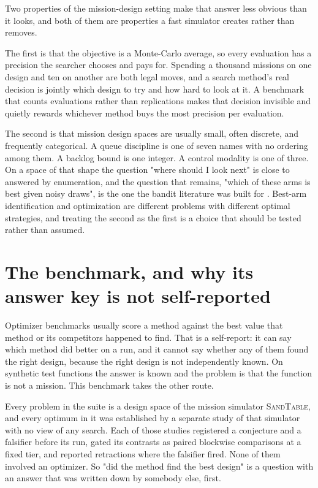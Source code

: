 \documentclass[11pt]{article}
\newcommand{\sandtable}{\textsc{SandTable}}
\begin{document}
Two properties of the mission-design setting make that answer less obvious than it looks, and both
of them are properties a fast simulator creates rather than removes.

The first is that the objective is a Monte-Carlo average, so every evaluation has a precision the
searcher chooses and pays for. Spending a thousand missions on one design and ten on another are
both legal moves, and a search method's real decision is jointly which design to try and how hard
to look at it. A benchmark that counts evaluations rather than replications makes that decision
invisible and quietly rewards whichever method buys the most precision per evaluation.

The second is that mission design spaces are usually small, often discrete, and frequently
categorical. A queue discipline is one of seven names with no ordering among them. A backlog bound
is one integer. A control modality is one of three. On a space of that shape the question "where
should I look next" is close to answered by enumeration, and the question that remains, "which of
these arms is best given noisy draws", is the one the bandit literature was built for
\citep{bubeck2011pure,karnin2013almost}. Best-arm identification and optimization are different
problems with different optimal strategies, and treating the second as the first is a choice that
should be tested rather than assumed.

\section{The benchmark, and why its answer key is not self-reported}
\label{sec:bench}

Optimizer benchmarks usually score a method against the best value that method or its competitors
happened to find. That is a self-report: it can say which method did better on a run, and it cannot
say whether any of them found the right design, because the right design is not independently
known. On synthetic test functions the answer is known and the problem is that the function is not a
mission. This benchmark takes the other route.

Every problem in the suite is a design space of the mission simulator \sandtable{}, and every
optimum in it was established by a separate study of that simulator with no view of any search. Each
of those studies registered a conjecture and a falsifier before its run, gated its contrasts as
paired blockwise comparisons at a fixed tier, and reported retractions where the falsifier fired.
None of them involved an optimizer. So "did the method find the best design" is a question with an
answer that was written down by somebody else, first.
\end{document}
